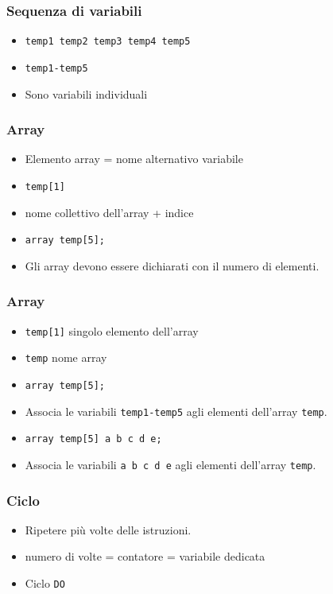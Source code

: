 \begin{frame}[containsverbatim]\frametitle{Sequenza di variabili}
  \begin{itemize}
  \item
    \verb+temp1 temp2 temp3 temp4 temp5+
  \item
    \verb+temp1-temp5+
  \item
    Sono variabili individuali
  \end{itemize}\end{frame}


\begin{frame}[containsverbatim]\frametitle{Array}
  \begin{itemize}
  \item
    Elemento array = nome alternativo variabile
  \item
    \verb!temp[1]!
  \item
    nome collettivo dell'array + indice
  \item
    \verb!array temp[5];!
  \item
    Gli array devono essere \alert{dichiarati} con il numero di elementi.
  \end{itemize}\end{frame}


\begin{frame}[containsverbatim]\frametitle{Array}
  \begin{itemize}
  \item
    \texttt{temp[1]} singolo elemento dell'array
  \item
    \texttt{temp} nome array
  \item
    \verb!array temp[5];!
  \item
    Associa le variabili \verb!temp1-temp5! agli elementi dell'array \verb!temp!.
  \item
    \verb!array temp[5] a b c d e;!
  \item
    Associa le variabili \verb!a b c d e! agli elementi dell'array \verb!temp!.
  \end{itemize}\end{frame}


\begin{frame}[containsverbatim]\frametitle{Ciclo}
  \begin{itemize}
  \item
    Ripetere pi{\`u} volte delle istruzioni.
  \item
    numero di volte = contatore = variabile dedicata
  \item
    Ciclo \verb+DO+
  \end{itemize}
\end{frame}



